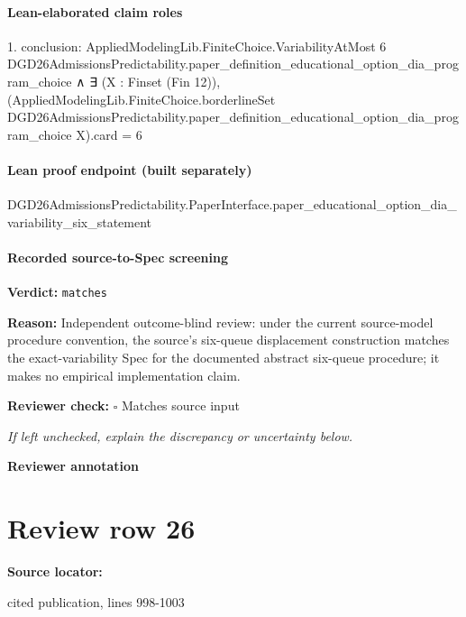 \documentclass[10pt]{article}
\newcommand{\reviewerbox}{%
  \par\noindent\fbox{\parbox{0.96\linewidth}{\rule{0pt}{0.38in}}}\par
}
\newcommand{\reviewmatch}[1]{%
  \par\noindent\textbf{Reviewer check:} $\square$\; #1\par
  \noindent\emph{If left unchecked, explain the discrepancy or uncertainty below.}\par
}
\begin{document}
\paragraph{Lean-elaborated claim roles}\begin{ReviewVerbatim}
1. conclusion: AppliedModelingLib.FiniteChoice.VariabilityAtMost 6
    DGD26AdmissionsPredictability.paper_definition_educational_option_dia_program_choice ∧
  ∃ (X : Finset (Fin 12)),
    (AppliedModelingLib.FiniteChoice.borderlineSet
          DGD26AdmissionsPredictability.paper_definition_educational_option_dia_program_choice X).card =
      6
\end{ReviewVerbatim}

\paragraph{Lean proof endpoint (built separately)}\begin{ReviewVerbatim}
DGD26AdmissionsPredictability.PaperInterface.paper_educational_option_dia_variability_six_statement
\end{ReviewVerbatim}

\paragraph{Recorded source-to-Spec screening}
\textbf{Verdict:} \texttt{matches}
\\
{\raggedright
\textbf{Reason:} Independent outcome-\allowbreak{}blind review:\allowbreak{} under the current source-\allowbreak{}model procedure convention, the source's six-\allowbreak{}queue displacement construction matches the exact-\allowbreak{}variability Spec for the documented abstract six-\allowbreak{}queue procedure;\allowbreak{} it makes no empirical implementation claim.\allowbreak{}
\par}
\reviewmatch{Matches source input}
\noindent\textbf{Reviewer annotation}\par
\reviewerbox
\clearpage
\hypertarget{source-claim-207dcf4700d4343b}{}
\section*{Review row 26}
\textbf{Source locator:} {\footnotesize\raggedright cited publication, lines 998-\allowbreak{}1003\par}
\end{document}
